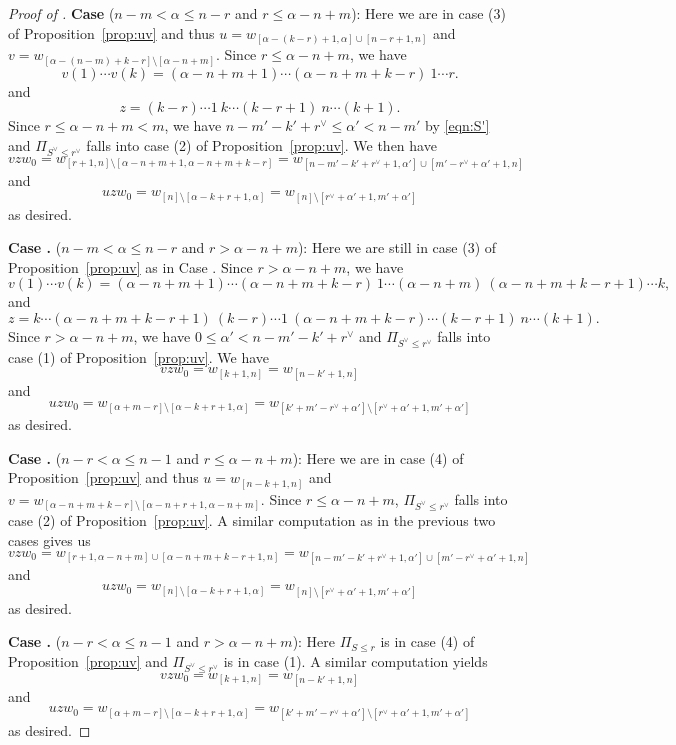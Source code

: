 \documentclass[12pt,reqno]{amsart}
\theoremstyle{definition}
\newcommand{\RNum}[1]{\uppercase\expandafter{\romannumeral #1\relax}}
\begin{document}
{\begin{proof}[Proof of ]
    \noindent\textbf{Case \RNum{1}} ($n-m<\alpha\leq n-r$ and $r\leq \alpha-n+m$): Here we are in case (3) of Proposition~\ref{prop:uv} and thus $u = w_{[\alpha-(k-r)+1,\alpha]\cup [n-r+1,n]}$ and $v = w_{[\alpha-(n-m)+k-r]\setminus [\alpha-n+m]}$. Since $r\leq \alpha-n+m$, we have 
    \[v(1)\cdots v(k) = (\alpha-n+m+1)\cdots (\alpha-n+m+k-r)\ 1\cdots r.\]
    and 
    \[z = (k-r)\cdots 1\ k\cdots (k-r+1)\ n\cdots (k+1).\]
    Since $r\leq \alpha-n+m<m$, we have $n-m'-k'+r^\vee\leq \alpha'<n-m'$ by \eqref{eqn:S'} and $\Pi_{S^\vee\leq r^\vee}$ falls into case (2) of Proposition~\ref{prop:uv}.
    We then have 
    \[vzw_0 = w_{[r+1,n]\setminus [\alpha-n+m+1,\alpha-n+m+k-r]} = w_{[n-m'-k'+r^\vee+1,\alpha']\cup[m'-r^\vee+\alpha'+1,n]}\]
    and
    \[uzw_0 = w_{[n]\setminus [\alpha-k+r+1,\alpha]} = w_{[n]\setminus [r^\vee+\alpha'+1,m'+\alpha']}\]
    as desired.
    

    \noindent\textbf{Case \RNum{2}.} ($n-m<\alpha\leq n-r$ and $r>\alpha-n+m$): Here we are still in case (3) of Proposition~\ref{prop:uv} as in Case \RNum{1}. Since $r>\alpha-n+m$, we have
    \[v(1)\cdots v(k) = (\alpha-n+m+1)\cdots (\alpha-n+m+k-r)\ 1\cdots (\alpha-n+m) \ (\alpha-n+m+k-r+1) \cdots k,\]
    and 
    \[z = k\cdots (\alpha-n+m+k-r+1)\ (k-r)\cdots 1\ (\alpha-n+m+k-r)\cdots (k-r+1)\ n\cdots (k+1).\]
    Since $r>\alpha-n+m$, we have $0\leq \alpha' < n-m'-k'+r^\vee$ and $\Pi_{S^\vee\leq r^\vee}$ falls into case (1) of Proposition~\ref{prop:uv}. We have
    \[vzw_0 = w_{[k+1,n]} = w_{[n-k'+1,n]}\]
    and
    \[uzw_0 = w_{[\alpha+m-r]\setminus [\alpha-k+r+1,\alpha]} = w_{[k'+m'-r^\vee+\alpha']\setminus [r^\vee+\alpha'+1,m'+\alpha']}\]
    as desired.
    
    \noindent\textbf{Case \RNum{3}.} ($n-r<\alpha\leq n-1$ and $r\leq \alpha-n+m$): Here we are in case (4) of Proposition~\ref{prop:uv} and thus $u = w_{[n-k+1,n]}$ and $v = w_{[\alpha-n+m+k-r]\setminus[\alpha-n+r+1,\alpha-n+m]}$. Since $r\leq \alpha-n+m$, $\Pi_{S^\vee\leq r^\vee}$ falls into case (2) of Proposition~\ref{prop:uv}. A similar computation as in the previous two cases gives us
    \[vzw_0 = w_{[r+1,\alpha-n+m]\cup [\alpha-n+m+k-r+1,n]} = w_{[n-m'-k'+r^\vee+1,\alpha']\cup[m'-r^\vee+\alpha'+1,n]}\]
    and 
    \[uzw_0 = w_{[n]\setminus [\alpha-k+r+1,\alpha]} = w_{[n]\setminus [r^\vee+\alpha'+1,m'+\alpha']}\]
    as desired.
    
    \noindent\textbf{Case \RNum{4}.} ($n-r<\alpha\leq n-1$ and $r> \alpha-n+m$): Here $\Pi_{S\leq r}$ is in case (4) of Proposition~\ref{prop:uv} and $\Pi_{S^\vee\leq r^\vee}$ is in case (1). A similar computation yields
    \[vzw_0 = w_{[k+1,n]} = w_{[n-k'+1,n]}\]
    and 
    \[uzw_0 = w_{[\alpha+m-r]\setminus [\alpha-k+r+1,\alpha]} = w_{[k'+m'-r^\vee+\alpha']\setminus [r^\vee+\alpha'+1,m'+\alpha']}\]
    as desired.
    

\end{proof}}
\end{document}
